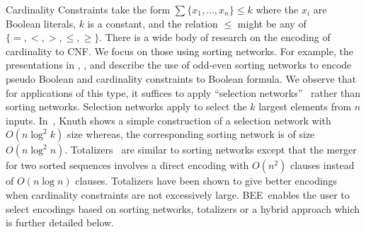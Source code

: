 \documentclass[runningheads,a4paper]{llncs}
\newcommand{\bee}{\textsf{BEE}}
\begin{document}
Cardinality Constraints take the form $\sum \{x_1,\ldots,x_n\} \leq k$
where the $x_i$ are Boolean literals, $k$ is a constant, and the
relation $\leq$ might be any of $\{=,<,>,\leq,\geq\}$.  There is a
wide body of research on the encoding of cardinality to CNF. We focus
on those using sorting networks. For example, the presentations in
\cite{EenS06}, \cite{CodishFFS11}, and \cite{AsinNOR09,AsinNOR11}
describe the use of odd-even sorting networks to encode pseudo Boolean
and cardinality constraints to Boolean formula.
We observe that for applications of this type, it suffices to apply
``selection networks''~\cite{Knuth73} rather than sorting
networks. Selection networks apply to select the $k$ largest
elements from $n$ inputs.  In~\cite{Knuth73}, Knuth shows a simple
construction of a selection network with $O(n \log^2 k)$ size whereas,
the corresponding sorting network is of size $O(n\log^2n)$.
Totalizers~\cite{BailleuxB03} are similar to sorting networks except
that the merger for two sorted sequences  involves a direct
encoding with $O(n^2)$ clauses instead of  $O(n\log
n)$ clauses. Totalizers have been shown to give better encodings when
cardinality constraints are not excessively large.
\bee\  enables the user to select encodings based on sorting networks,
totalizers or a hybrid approach which is further detailed below.
\end{document}
